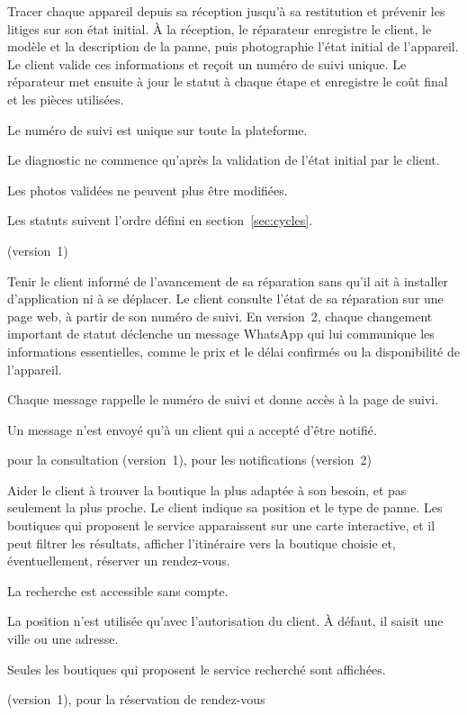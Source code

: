   {Tracer chaque appareil depuis sa réception jusqu’à sa restitution et prévenir les litiges sur son état initial.}
  {À la réception, le réparateur enregistre le client, le modèle et la description de la panne, puis photographie l’état initial de l’appareil. Le client valide ces informations et reçoit un numéro de suivi unique. Le réparateur met ensuite à jour le statut à chaque étape et enregistre le coût final et les pièces utilisées.}
  {\begin{cdccellitems}
    \item Le numéro de suivi est unique sur toute la plateforme.
    \item Le diagnostic ne commence qu’après la validation de l’état initial par le client.
    \item Les photos validées ne peuvent plus être modifiées.
    \item Les statuts suivent l’ordre défini en section~\ref{sec:cycles}.
  \end{cdccellitems}}
  {\prioMust{} (version~1)}

  {Tenir le client informé de l’avancement de sa réparation sans qu’il ait à installer d’application ni à se déplacer.}
  {Le client consulte l’état de sa réparation sur une page web, à partir de son numéro de suivi. En version~2, chaque changement important de statut déclenche un message WhatsApp qui lui communique les informations essentielles, comme le prix et le délai confirmés ou la disponibilité de l’appareil.}
  {\begin{cdccellitems}
    \item Chaque message rappelle le numéro de suivi et donne accès à la page de suivi.
    \item Un message n’est envoyé qu’à un client qui a accepté d’être notifié.
  \end{cdccellitems}}
  {\prioMust{} pour la consultation (version~1), \prioShould{} pour les notifications (version~2)}

  {Aider le client à trouver la boutique la plus adaptée à son besoin, et pas seulement la plus proche.}
  {Le client indique sa position et le type de panne. Les boutiques qui proposent le service apparaissent sur une carte interactive, et il peut filtrer les résultats, afficher l’itinéraire vers la boutique choisie et, éventuellement, réserver un rendez-vous.}
  {\begin{cdccellitems}
    \item La recherche est accessible sans compte.
    \item La position n’est utilisée qu’avec l’autorisation du client. À défaut, il saisit une ville ou une adresse.
    \item Seules les boutiques qui proposent le service recherché sont affichées.
  \end{cdccellitems}}
  {\prioMust{} (version~1), \prioCould{} pour la réservation de rendez-vous}

